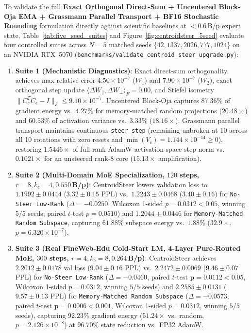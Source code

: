 \documentclass[10pt,twocolumn,letterpaper]{article}
\begin{document}
To validate the full \textbf{Exact Orthogonal Direct-Sum + Uncentered Block-Oja EMA + Grassmann Parallel Transport + BF16 Stochastic Rounding} formulation directly against scientific baselines at $<0.6$\,B/p expert state, Table~\ref{tab:five_seed_suites} and Figure~\ref{fig:centroidsteer_5seed} evaluate four controlled suites across $N=5$ matched seeds $\{42, 1337, 2026, 777, 1024\}$ on an NVIDIA RTX~5070 (\texttt{benchmarks/validate\_centroid\_steer\_upgrade.py}):
\begin{enumerate}
    \item \textbf{Suite 1 (Mechanistic Diagnostics)}: Exact direct-sum orthogonality achieves max relative error $4.50 \times 10^{-7}$ ($W_1$) and $7.90 \times 10^{-7}$ ($W_2$), exact orthogonal step update $\langle \Delta W_{\parallel}, \Delta W_{\perp} \rangle_F = 0.00$, and Stiefel isometry $\|C_e^T C_e - I\|_F \le 9.10 \times 10^{-7}$. Uncentered Block-Oja captures $\mathbf{87.36\%}$ of gradient energy vs.\ $4.27\%$ for memory-matched random projections ($\mathbf{20.48\times}$) and $60.53\%$ of activation variance vs.\ $3.33\%$ ($\mathbf{18.16\times}$). Grassmann parallel transport maintains continuous \texttt{steer\_step} (remaining unbroken at $10$ across all 10 rotations with zero resets and $\min(V_c) = 1.144 \times 10^{-14} \ge 0$), restoring $\mathbf{1.5446\times}$ of full-rank AdamW activation-space step norm vs.\ $0.1021\times$ for an unsteered rank-8 core ($\mathbf{15.13\times}$ amplification).
    \item \textbf{Suite 2 (Multi-Domain MoE Specialization, $120$ steps, $r=8, k_c=4, 0.550$\,B/p)}: CentroidSteer lowers validation loss to $1.1992 \pm 0.0444$ ($3.32 \pm 0.15$ PPL) vs.\ $1.2243 \pm 0.0468$ ($3.40 \pm 0.16$) for \texttt{No-Steer Low-Rank} ($\Delta = -0.0250$, Wilcoxon 1-sided $p=0.0312 < 0.05$, winning $5/5$ seeds; paired $t$-test $p=0.0510$) and $1.2044 \pm 0.0446$ for \texttt{Memory-Matched Random Subspace}, capturing $61.88\%$ subspace energy vs.\ $1.88\%$ ($32.9\times$, $p = 6.320 \times 10^{-7}$).
    \item \textbf{Suite 3 (Real FineWeb-Edu Cold-Start LM, 4-Layer Pure-Routed MoE, $300$ steps, $r=4, k_c=8, 0.264$\,B/p)}: CentroidSteer achieves $\mathbf{2.2012 \pm 0.0178}$ val loss ($\mathbf{9.04 \pm 0.16}$ PPL) vs.\ $2.2472 \pm 0.0069$ ($9.46 \pm 0.07$ PPL) for \texttt{No-Steer Low-Rank} ($\Delta = -0.0460$, paired $t$-test $\mathbf{p=0.0112 < 0.05}$, Wilcoxon 1-sided $p=0.0312$, winning $5/5$ seeds) and $2.2585 \pm 0.0131$ ($9.57 \pm 0.13$ PPL) for \texttt{Memory-Matched Random Subspace} ($\Delta = -0.0573$, paired $t$-test $\mathbf{p=0.0006 < 0.001}$, Wilcoxon 1-sided $p=0.0312$, winning $5/5$ seeds), capturing $\mathbf{92.23\%}$ gradient energy ($51.24\times$ vs.\ random, $p = 2.126 \times 10^{-8}$) at $96.70\%$ state reduction vs.\ FP32 AdamW.

\end{enumerate}
\end{document}
